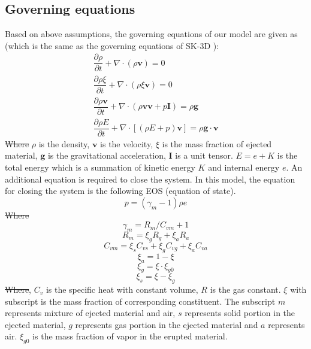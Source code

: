 \documentclass[gmd, manuscript]{copernicus} %
\providecommand{\DIFadd}[1]{{\protect\color{blue}\uwave{#1}}} %
\providecommand{\DIFdel}[1]{{\protect\color{red}\sout{#1}}}                      %
\providecommand{\DIFaddbegin}{} %
\providecommand{\DIFaddend}{} %
\providecommand{\DIFdelbegin}{} %
\providecommand{\DIFdelend}{} %
\begin{document}
\subsection{Governing equations}
Based on above assumptions, the governing equations of our model are given as (which is the same as the governing equations of SK-3D \citep{suzuki2005numerical}):
\begin{align}
\dfrac{\partial \rho}{\partial t} + \nabla \cdot \left(\rho \textbf{v}\right) = 0 \label{eq:gov-cs-rho} \\
\dfrac{\partial \rho \xi}{\partial t} + \nabla \cdot \left(\rho \xi \textbf{v}\right) = 0 \label{eq:gov-cs-ks}\\
\dfrac{\partial \rho \textbf{v}}{\partial t} + \nabla \cdot \left(\rho \textbf{v} \textbf{v} + p\textbf{I}\right) = \rho \textbf{g} \label{eq:gov-cs-v} \\
\dfrac{\partial \rho E}{\partial t} + \nabla \cdot \left[\left(\rho E + p \right)\textbf{v}\right] = \rho \textbf{g} \cdot\textbf{v} \label{eq:gov-cs-e}
\end{align}
\DIFdelbegin \DIFdel{Where }\DIFdelend \DIFaddbegin \DIFadd{where }\DIFaddend $\rho$ is the density, $\textbf{v}$ is the velocity, $\xi$ is the mass fraction of ejected material, $\textbf{g}$ is the gravitational acceleration, $\textbf{I}$ is a unit tensor.
$E = e + K $ is the total energy which is a summation of kinetic energy $K$ and internal energy $e$.
An additional equation is required to close the system. In this model, the equation for closing the system is the following EOS (equation of state).
\begin{equation}
p = \left(\gamma_m - 1\right)\rho e \label{eq:EOS}
\end{equation}
\DIFdelbegin \DIFdel{Where 
}\DIFdelend \DIFaddbegin \DIFadd{where 
}\DIFaddend \begin{equation}
\gamma_m = R_m/C_{vm} + 1 \label{eq:gov-gm}
\end{equation}
\begin{equation}
R_m = \xi_g R_g + \xi_a R_a  \label{eq:gov-Rm}
\end{equation}
\begin{equation}
C_{vm} = \xi_s C_{vs} + \xi_g C_{vg} + \xi_a C_{va} \label{eq:gov-Cvm}
\end{equation}
\begin{equation}
\xi_a = 1 - \xi \label{eq:gov-na}
\end{equation}
\begin{equation}
\xi_g = \xi \cdot \xi_{g0} \label{eq:gov-ng}
\end{equation}
\begin{equation}
\xi_s = \xi - \xi_g \label{eq:gov-ns}
\end{equation}
\DIFdelbegin \DIFdel{Where}\DIFdelend \DIFaddbegin \DIFadd{where}\DIFaddend , $C_v$ is the specific heat with constant volume, $R$ is the gas constant. $\xi$ with subscript is the mass fraction of corresponding constituent. The subscript 
$m$ represents mixture of ejected material and air, $s$ represents solid portion in the ejected material, $g$ represents gas portion in the ejected material and $a$ represents air. $\xi_{g0}$ is the mass fraction of vapor in the erupted material.
\end{document}
